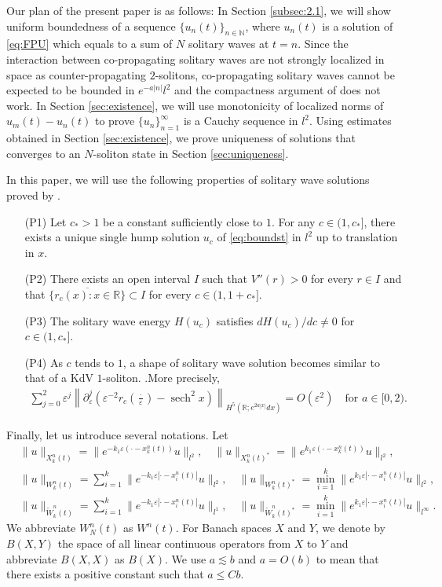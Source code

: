 \documentclass[11pt]{amsart}
\theoremstyle{remark}
\numberwithin{equation}{section}
\begin{document}
 Our plan of the present paper is as follows:
In Section \ref{subsec:2.1}, we will show uniform boundedness of a
sequence $\{u_n(t)\}_{n\in{\mathbb{N}}}$, where 
$u_n(t)$ is a solution of \eqref{eq:FPU} which equals to a sum of $N$
solitary waves at $t=n$. Since the interaction between co-propagating solitary
waves are not strongly localized in space as counter-propagating $2$-solitons,
co-propagating solitary waves cannot be expected to be bounded in  $e^{-a|n|}l^2$
and the compactness argument of \cite{Hoff-Way2} does not work.
In Section \ref{sec:existence}, we will use monotonicity of localized norms
of $u_m(t)-u_n(t)$ to prove $\{u_n\}_{n=1}^\infty$ is a Cauchy sequence in $l^2$.
Using estimates obtained in Section \ref{sec:existence},
we prove uniqueness of solutions that converges to an 
$N$-soliton state in Section \ref{sec:uniqueness}. 
\par
In this paper, we will use the following properties of solitary wave
solutions proved by \cite{FP1}.
\begin{itemize}
\item[(P1)]
Let $c_*>1$ be a constant sufficiently close to $1$.
For any $c\in(1,c_*]$, there exists a unique single hump solution $u_c$
of \eqref{eq:boundst} in $l^2$ up to translation in $x$.
\item[(P2)] There exists an open interval $I$ such that 
$V''(r)>0$ for every $r\in I$ and that
$\overline{\{r_c(x):x\in{\mathbb{R}}\}}\subset I$ for every $c\in(1,1+c_*]$.
\item[(P3)] 
The solitary wave energy $H(u_c)$ satisfies
$dH(u_c)/dc\ne 0$ for $c\in(1,c_*]$.
\item[(P4)]
As $c$ tends to $1$, a shape of solitary wave solution becomes similar to
that of a KdV $1$-soliton. .More precisely, 
\begin{align*}
\sum_{j=0}^2{\varepsilon}^j\left\|{\partial}_\varepsilon^j\left(
{\varepsilon}^{-2}r_c\left(\frac{\cdot}{\varepsilon}\right)-\operatorname{sech}^2x\right)
\right\|_{H^5({\mathbb{R}};e^{2a|x|}dx)}=O({\varepsilon}^{2})
\quad\text{for $a\in[0,2)$.}
\end{align*}
\end{itemize}
\par
Finally, let us introduce several notations.
Let
\begin{align*}
& \|u\|_{X_k^n(t)}=\| e^{-k_1{\varepsilon}(\cdot-x_k^n(t))}u\|_{l^2},
\quad \|u\|_{X_k^n(t)^*}=\| e^{k_1{\varepsilon}(\cdot-x_k^n(t))}u\|_{l^2},
\\ &
\|u\|_{W_k^n(t)}=\sum_{i=1}^k\|e^{-k_1{\varepsilon}|\cdot-x_i^n(t)|}u\|_{l^2},
\quad \|u\|_{W_k^n(t)^*}=\min_{i=1}^k \|e^{k_1{\varepsilon}|\cdot-x_i^n(t)|}u\|_{l^2},
\\ &
\|u\|_{\widetilde{W}_k^n(t)}=\sum_{i=1}^k\|e^{-k_1{\varepsilon}|\cdot-x_i^n(t)|}u\|_{l^1},
\quad \|u\|_{\widetilde{W}_k^n(t)^*}
=\min_{i=1}^k \|e^{k_1{\varepsilon}|\cdot-x_i^n(t)|}u\|_{l^\infty}.
\end{align*}
We abbreviate $W_N^n(t)$ as $W^n(t)$.
For Banach spaces $X$ and $Y$, we denote by $B(X,Y)$ the space of 
all linear continuous operators from $X$ to $Y$ and abbreviate
$B(X,X)$ as $B(X)$.
We use $a\lesssim b$ and $a=O(b)$ to mean that there exists a positive constant
such that $a\le Cb$.
\end{document}
